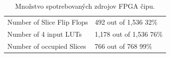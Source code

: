 \documentclass[11pt,a4paper]{article}
\begin{document}
\begin{table}[H]
  \begin{center}
    \begin{tabular}{l|l}
        Number of Slice Flip Flops & 492 \hspace{1.65mm} out of 1,536 32\% \\
        Number of 4 input LUTs     & 1,178 out of 1,536 76\% \\
        Number of occupied Slices  & 766 \hspace{1.65mm} out of 768 99\%   \\
    \end{tabular}
    \caption{Množstvo spotrebovaných zdrojov FPGA čipu.}
    \label{tab:fpga_resources}
  \end{center}
\end{table}


%
%    
\end{document}
